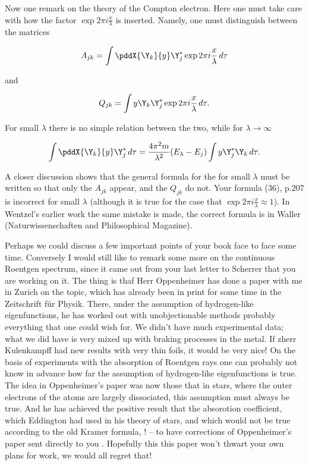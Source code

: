 \documentclass{article}
\newcommand{\uequ}[1]{
\begin{align*}
#1
\end{align*}
}
\begin{document}
Now one remark on the theory of the Compton electron. Here one must take care with how the factor $\exp{2\pi i\frac{x}{\lambda}}$ is inserted. Namely, one must distinguish between the matrices
\uequ{
A_{jk} = \int{\pddX{\Y_k}{y}\Y^*_j \exp{2\pi i \frac{x}{\lambda}}}\,d\tau
}
and
\uequ{
Q_{jk} = \int{y\Y_k \Y^*_j \exp{2\pi i \frac{x}{\lambda}}}\,d\tau .
}
For small $\lambda$ there is no simple relation between the two, while for $\lambda \to \infty$
\uequ{
\int{\pddX{\Y_k}{y}\Y^*_j}\,d\tau = 
\frac{4\pi^2 m}{\lambda^2}(E_\lambda - E_j)\int{y \Y^*_j \Y_k}\,d\tau.
}
A closer discussion shows that the general formula for the  for small $\lambda$ must be written so that only the $A_{jk}$ appear, and the $Q_{jk}$ do not. Your formula (36), p.207 is incorrect for small $\lambda$ (although it is true for the case that $\exp{2\pi i\frac{x}{\lambda}} \approx 1$). In Wentzel's earlier work the same mistake is made, the correct formula is in Waller (Naturwissenschaften and Philosophical Magazine).

Perhaps we could discuss a few important points of your book face to face some time. Conversely I would still like to remark some more on the continuous Roentgen spectrum, since it came out from your last letter to Scherrer that you are working on it. The thing is thaf Herr Oppenheimer has done a paper with me in Zurich on the topic, which has already been in print for some time in the Zeitschrift f\"ur Physik. There, under the assumption of hydrogen-like eigenfunctions, he has worked out with unobjectionable methods probably everything that one could wish for. We didn't have much experimental data; what we did have is very mixed up with braking processes in the metal. If zherr Kulenkampff had new results with very thin foils, it would be very nice! On the basis of experiments with the absorption of Roentgen rays one can probably not know in advance how far the assumption of hydrogen-like eigenfunctions is true. The idea in Oppenheimer's paper was now those that in stars, where the outer electrons of the atoms are largely dissociated, this assumption must always be true. And he has achieved the positive result that the absorotion coefficient, which Eddington had used in his theory of stars, and which would not be true according to the old Kramer formula, ! --  to have corrections of Oppenheimer's paper sent directly to you . Hopefully this this paper won't thwart your own plans for work, we would all regret that!
\end{document}
